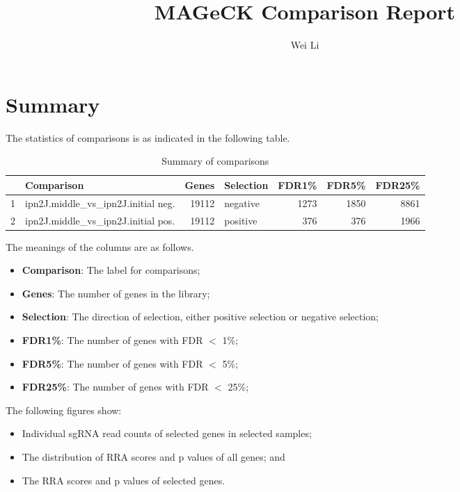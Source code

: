 \documentclass{article}
\begin{document}

\title{MAGeCK Comparison Report}
\author{Wei Li}

\maketitle


\tableofcontents

\section{Summary}


The statistics of comparisons is as indicated in the following table. 

\begin{table}[ht]
\centering
\begin{tabular}{rlrlrrr}
  \hline
 & Comparison & Genes & Selection & FDR1\% & FDR5\% & FDR25\% \\ 
  \hline
1 & ipn2J.middle\_vs\_ipn2J.initial neg. & 19112 & negative & 1273 & 1850 & 8861 \\ 
  2 & ipn2J.middle\_vs\_ipn2J.initial pos. & 19112 & positive & 376 & 376 & 1966 \\ 
   \hline
\end{tabular}
\caption{Summary of comparisons} 
\label{tab:one}
\end{table}
The meanings of the columns are as follows.

\begin{itemize}
\item \textbf{Comparison}: The label for comparisons;
\item \textbf{Genes}: The number of genes in the library;
\item \textbf{Selection}: The direction of selection, either positive selection or negative selection;
\item \textbf{FDR1\%}: The number of genes with FDR $<$ 1\%;
\item \textbf{FDR5\%}: The number of genes with FDR $<$ 5\%;
\item \textbf{FDR25\%}: The number of genes with FDR $<$ 25\%;
\end{itemize}

The following figures show:

\begin{itemize}
\item Individual sgRNA read counts of selected genes in selected samples; 
\item The distribution of RRA scores and p values of all genes; and
\item The RRA scores and p values of selected genes.
\end{itemize}
\end{document}
